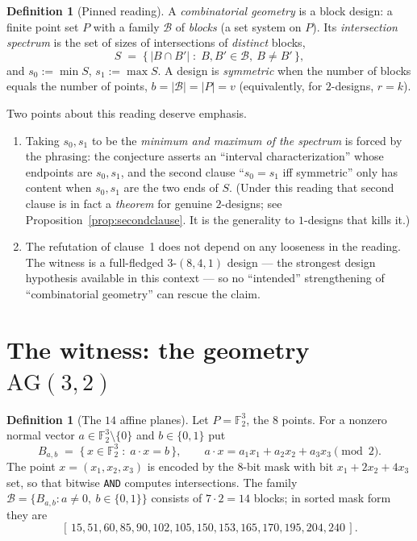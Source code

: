 \documentclass[11pt]{article}
\theoremstyle{definition}
\newtheorem{definition}[theorem]{Definition}
\theoremstyle{remark}
\newcommand{\F}{\mathbb{F}}
\newcommand{\AG}{\mathrm{AG}}
\begin{document}
\begin{definition}[Pinned reading]\label{def:pinned}
A \emph{combinatorial geometry} is a block design: a finite point set $P$ with
a family $\mathcal{B}$ of \emph{blocks} (a set system on $P$). Its
\emph{intersection spectrum} is the set of sizes of intersections of
\emph{distinct} blocks,
\[
S \;=\; \{\, |B \cap B'| \;:\; B,B' \in \mathcal{B},\ B \neq B' \,\},
\]
and $s_0 := \min S$, $s_1 := \max S$. A design is \emph{symmetric} when the
number of blocks equals the number of points, $b = |\mathcal{B}| = |P| = v$
(equivalently, for $2$-designs, $r = k$).
\end{definition}

Two points about this reading deserve emphasis.

\begin{enumerate}
\item Taking $s_0,s_1$ to be the \emph{minimum and maximum of the spectrum} is
  forced by the phrasing: the conjecture asserts an ``interval
  characterization'' whose endpoints are $s_0,s_1$, and the second clause
  ``$s_0 = s_1$ iff symmetric'' only has content when $s_0,s_1$ are the two
  ends of $S$. (Under this reading that second clause is in fact a
  \emph{theorem} for genuine $2$-designs; see
  Proposition~\ref{prop:secondclause}. It is the generality to
  $1$-designs that kills it.)
\item The refutation of clause~1 does not depend on any looseness in the
  reading. The witness is a full-fledged $3$-$(8,4,1)$ design --- the strongest
  design hypothesis available in this context --- so no ``intended''
  strengthening of ``combinatorial geometry'' can rescue the claim.
\end{enumerate}

\section{The witness: the geometry $\AG(3,2)$}

\begin{definition}[The $14$ affine planes]\label{def:ag32}
Let $P = \F_2^3$, the $8$ points. For a nonzero normal vector
$a \in \F_2^3 \setminus \{0\}$ and $b \in \{0,1\}$ put
\[
B_{a,b} \;=\; \{\, x \in \F_2^3 \;:\; a \cdot x = b \,\},
\qquad
a\cdot x = a_1x_1 + a_2x_2 + a_3x_3 \pmod 2 .
\]
The point $x=(x_1,x_2,x_3)$ is encoded by the $8$-bit mask with bit
$x_1 + 2x_2 + 4x_3$ set, so that bitwise \texttt{AND} computes intersections.
The family $\mathcal{B} = \{B_{a,b} : a \neq 0,\ b \in \{0,1\}\}$ consists of
$7 \cdot 2 = 14$ blocks; in sorted mask form they are
\[
[\,15, 51, 60, 85, 90, 102, 105, 150, 153, 165, 170, 195, 204, 240\,].
\]
\end{definition}
\end{document}
